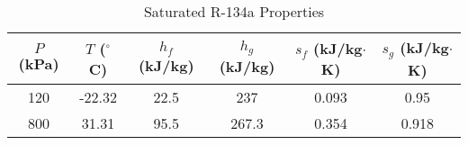 \begin{table}[h!]
\centering
\caption*{Saturated R-134a Properties}
\begin{tabular}{|c|c|c|c|c|c|}
\hline
$P$ (kPa) & $T$ ($^\circ$C) & $h_f$ (kJ/kg) & $h_g$ (kJ/kg) & $s_f$ (kJ/kg$\cdot$K) & $s_g$ (kJ/kg$\cdot$K) \\
\hline
120 & -22.32 & 22.5 & 237 & 0.093 & 0.95 \\
800 & 31.31  & 95.5 & 267.3 & 0.354 & 0.918 \\
\hline
\end{tabular}
\end{table}
